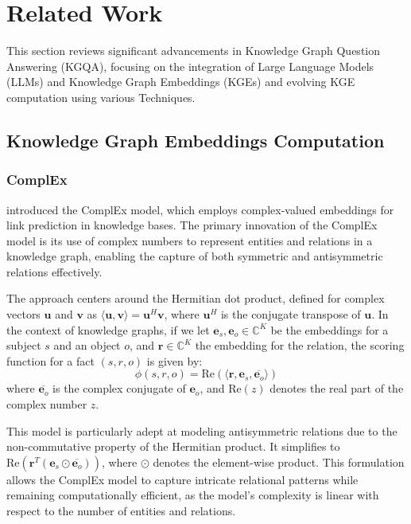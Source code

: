 \documentclass[12pt]{article}
\begin{document}
\section{Related Work}
This section reviews significant advancements in Knowledge Graph Question Answering (KGQA), focusing on the integration of Large Language Models (LLMs) and Knowledge Graph Embeddings (KGEs) and evolving KGE computation using various Techniques.

\subsection{Knowledge Graph Embeddings Computation}

\subsubsection{ComplEx}
\textcite{trouillon2016complex}
 introduced the ComplEx model, which employs complex-valued embeddings for link prediction in knowledge bases. The primary innovation of the ComplEx model is its use of complex numbers to represent entities and relations in a knowledge graph, enabling the capture of both symmetric and antisymmetric relations effectively.

The approach centers around the Hermitian dot product, defined for complex vectors $\mathbf{u}$ and $\mathbf{v}$ as $\langle \mathbf{u}, \mathbf{v} \rangle = \mathbf{u}^H \mathbf{v}$, where $\mathbf{u}^H$ is the conjugate transpose of $\mathbf{u}$. In the context of knowledge graphs, if we let $\mathbf{e}_s, \mathbf{e}_o \in \mathbb{C}^K$ be the embeddings for a subject $s$ and an object $o$, and $\mathbf{r} \in \mathbb{C}^K$ the embedding for the relation, the scoring function for a fact $(s, r, o)$ is given by:
\[
\phi(s, r, o) = \text{Re}(\langle \mathbf{r}, \mathbf{e}_s, \overline{\mathbf{e}_o} \rangle)
\]
where $\overline{\mathbf{e}_o}$ is the complex conjugate of $\mathbf{e}_o$, and $\text{Re}(z)$ denotes the real part of the complex number $z$.

This model is particularly adept at modeling antisymmetric relations due to the non-commutative property of the Hermitian product. It simplifies to $\text{Re}(\mathbf{r}^T (\mathbf{e}_s \odot \overline{\mathbf{e}_o}))$, where $\odot$ denotes the element-wise product. This formulation allows the ComplEx model to capture intricate relational patterns while remaining computationally efficient, as the model's complexity is linear with respect to the number of entities and relations.
\end{document}
